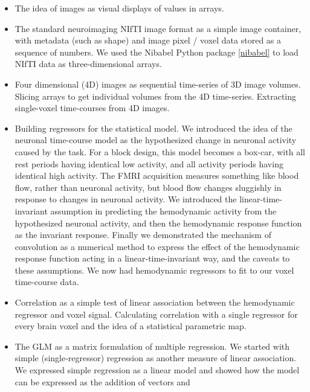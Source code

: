 \begin{itemize}

\item
    The idea of images as visual displays of values in arrays.
\item
    The standard neuroimaging NIfTI image format as a simple image container,
        with metadata (such as shape) and image pixel / voxel data stored as
        a sequence of numbers.  We used the Nibabel Python package
        \cref{nibabel} to load NIfTI data as three-dimensional arrays.
\item
    Four dimensional (4D) images as sequential time-series of 3D image
        volumes.  Slicing arrays to get individual volumes from the 4D
        time-series.  Extracting single-voxel time-courses from 4D images.
\item
    Building regressors for the statistical model.  We introduced the idea of
        the neuronal time-course model as the hypothesized change in neuronal
        activity caused by the task.  For a block design, this model becomes a
        box-car, with all rest periods having identical low activity, and all
        activity periods having identical high activity.  The FMRI acquisition
        measures something like blood flow, rather than neuronal activity, but
        blood flow changes sluggishly in response to changes in neuronal
        activity.  We introduced the linear-time-invariant assumption in
        predicting the hemodynamic activity from the hypothesized neuronal
        activity, and then the hemodynamic response function as the invariant
        response.  Finally we demonstrated the mechanism of convolution as a
        numerical method to express the effect of the hemodynamic response
        function acting in a linear-time-invariant way, and the caveats to
        these assumptions.  We now had hemodynamic regressors to fit to our
        voxel time-course data.
\item
    Correlation as a simple test of linear association between the hemodynamic
        regressor and voxel signal.  Calculating correlation with a single
        regressor for every brain voxel and the idea of a statistical
        parametric map.
\item
    The GLM as a matrix formulation of multiple regression.  We started with
        simple (single-regressor) regression as another measure of linear
        association.  We expressed simple regression as a linear model and
        showed how the model can be expressed as the addition of vectors and

\end{itemize}
